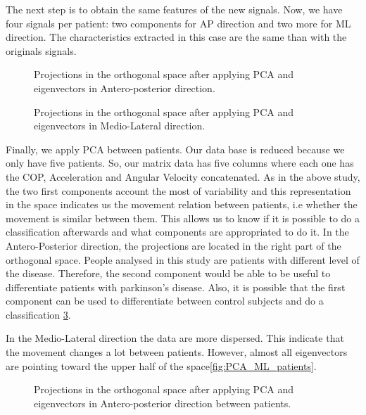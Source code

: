 The next step is to obtain the same features of the new signals. Now, we have four signals per patient: two components for AP direction and two more for ML direction. The characteristics extracted in this case are the same than with the originals signals.
\begin{figure}[H]
	\centering
	\caption{Projections in the orthogonal space after applying PCA and eigenvectors in Antero-posterior direction.}
	\label{fig:PCA_AP}
\end{figure}

\begin{figure}[H]
	\centering
	\caption{Projections in the orthogonal space after applying PCA and eigenvectors in Medio-Lateral direction.}
	\label{fig:PCA_ML}
\end{figure}



Finally, we apply PCA between patients. Our data base is reduced because we only have five patients. So, our matrix data has five columns where each one has the COP, Acceleration and Angular Velocity concatenated. As in the above study, the two first components account the most of variability and this representation in the space indicates us the movement relation between patients, i.e whether the movement is similar between them. This allows us to know if it is possible to do a classification afterwards and what components are appropriated to do it.
In the Antero-Posterior direction, the projections are located in the right part of the orthogonal space. People analysed in this study are patients with different level of the disease. Therefore, the second component would be able to be useful to differentiate patients with parkinson’s disease. Also, it is possible that the first component can be used to differentiate between control subjects and do a classification \ref{fig:PCA_AP_patients}.

In the Medio-Lateral direction the data are more dispersed. This indicate that the movement changes a lot between patients. However, almost all eigenvectors are pointing toward the upper half of the space\ref{fig:PCA_ML_patients}.

\begin{figure}[H]
	\centering
	\caption{Projections in the orthogonal space after applying PCA and eigenvectors in Antero-posterior direction between patients.}
	\label{fig:PCA_AP_patients}
\end{figure}

